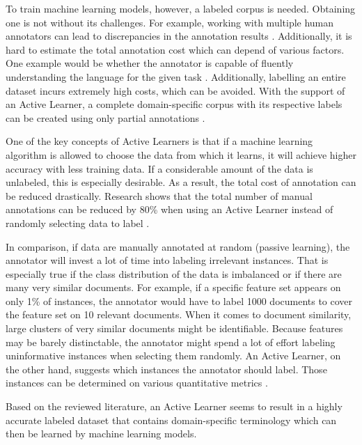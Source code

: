 \documentclass[11pt, a4paper]{article}
\begin{document}
To train machine learning models, however, a labeled corpus is needed. Obtaining one is not without its challenges.
For example, working with multiple human annotators can lead to discrepancies in the annotation results \citep{kim2008corpusannotation, rayan2019sentimentanalysisemail}. 
Additionally, it is hard to estimate the total annotation cost which can depend of various factors. One example would be whether the annotator is capable of fluently understanding 
the language for the given task \citep{arora2009estimationgannotationcost}. Additionally, labelling an entire dataset incurs extremely high costs, 
which can be avoided. With the support of an Active Learner, a complete domain-specific corpus with its respective labels can be 
created using only partial annotations \citep{park2015EfficientExtraction}. 

One of the key concepts of Active Learners is that if a machine learning algorithm is allowed to choose the data from which it learns, 
it will achieve higher accuracy with less training data. If a considerable amount of the data is unlabeled, this is especially desirable. 
As a result, the total cost of annotation can be reduced drastically. Research shows that the total number of 
manual annotations can be reduced by 80\% when using an Active Learner instead of randomly 
selecting data to label \citep{baldridgeosborne2004active}.

In comparison, if data are manually annotated at random (passive learning), the annotator will invest a lot of time into labeling irrelevant instances. 
That is especially true if the class distribution of the data is imbalanced or if there are many very similar documents. 
For example, if a specific feature set appears on only 1\% of instances, the annotator would have to label 1000 documents to cover 
the feature set on 10 relevant documents. When it comes to document similarity, large clusters of very similar documents might be 
identifiable. Because features may be barely distinctable, the annotator might spend a lot of effort labeling uninformative instances 
when selecting them randomly. An Active Learner, on the other hand, suggests which instances the annotator should label. Those instances can be 
determined on various quantitative metrics \citep{miller2020activelearningapproaches}.

Based on the reviewed literature, an Active Learner seems to result in a highly accurate labeled dataset that contains domain-specific terminology which can then be learned
by machine learning models.
\end{document}
